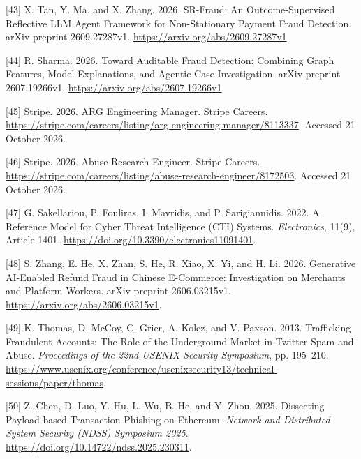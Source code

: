\documentclass[acmlarge,review,anonymous,nonacm]{acmart}
\newlength{\cslhangindent}
\newlength{\cslentryspacingunit} %
\newenvironment{CSLReferences}[2] %
 {\bibliofont %
  \setlength{\parindent}{0pt}
  \ifodd #1
  \let\oldpar\par
  \def\par{\hangindent=\cslhangindent\oldpar}
  \fi
  \setlength{\parskip}{#2\cslentryspacingunit}
 }%
 {}
\begin{document}
\begin{CSLReferences}{1}{1}
\leavevmode{}%
{[}43{]} X. Tan, Y. Ma, and X. Zhang. 2026. SR-Fraud: An
Outcome-Supervised Reflective LLM Agent Framework for Non-Stationary
Payment Fraud Detection. arXiv preprint 2609.27287v1.
\url{https://arxiv.org/abs/2609.27287v1}.

\leavevmode{}%
{[}44{]} R. Sharma. 2026. Toward Auditable Fraud Detection: Combining
Graph Features, Model Explanations, and Agentic Case Investigation.
arXiv preprint 2607.19266v1. \url{https://arxiv.org/abs/2607.19266v1}.

\leavevmode{}%
{[}45{]} Stripe. 2026. ARG Engineering Manager. Stripe Careers.
\url{https://stripe.com/careers/listing/arg-engineering-manager/8113337}.
Accessed 21 October 2026.

\leavevmode{}%
{[}46{]} Stripe. 2026. Abuse Research Engineer. Stripe Careers.
\url{https://stripe.com/careers/listing/abuse-research-engineer/8172503}.
Accessed 21 October 2026.

\leavevmode{}%
{[}47{]} G. Sakellariou, P. Fouliras, I. Mavridis, and P. Sarigiannidis.
2022. A Reference Model for Cyber Threat Intelligence (CTI) Systems.
\emph{Electronics}, 11(9), Article 1401.
\url{https://doi.org/10.3390/electronics11091401}.

\leavevmode{}%
{[}48{]} S. Zhang, E. He, X. Zhan, S. He, R. Xiao, X. Yi, and H. Li.
2026. Generative AI-Enabled Refund Fraud in Chinese E-Commerce:
Investigation on Merchants and Platform Workers. arXiv preprint
2606.03215v1. \url{https://arxiv.org/abs/2606.03215v1}.

\leavevmode{}%
{[}49{]} K. Thomas, D. McCoy, C. Grier, A. Kolcz, and V. Paxson. 2013.
Trafficking Fraudulent Accounts: The Role of the Underground Market in
Twitter Spam and Abuse. \emph{Proceedings of the 22nd USENIX Security
Symposium}, pp. 195--210.
\url{https://www.usenix.org/conference/usenixsecurity13/technical-sessions/paper/thomas}.

\leavevmode{}%
{[}50{]} Z. Chen, D. Luo, Y. Hu, L. Wu, B. He, and Y. Zhou. 2025.
Dissecting Payload-based Transaction Phishing on Ethereum. \emph{Network
and Distributed System Security (NDSS) Symposium 2025}.
\url{https://doi.org/10.14722/ndss.2025.230311}.


\end{CSLReferences}
\end{document}
